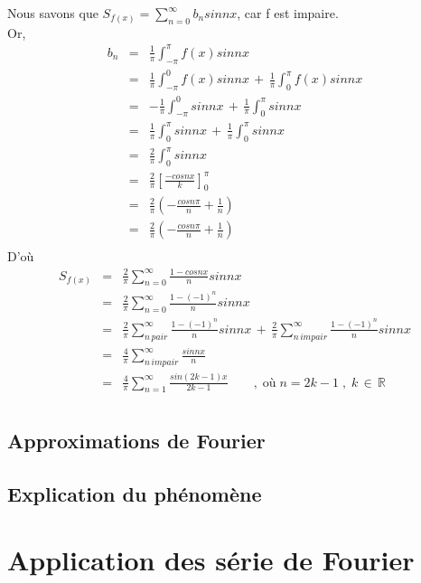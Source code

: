 \documentclass[a4paper,12pt]{report}
\begin{document}
Nous savons que $S_{f(x)}=\displaystyle\sum\limits_{n=0}^{\infty} b_{n}sinnx$, car f est impaire.\\
Or, \begin{eqnarray*}
b_{n}&=&\frac{1}{\pi}\int_{-\pi}^{\pi}f(x)sinnx\\
		 &=&\frac{1}{\pi}\int_{-\pi}^{0}f(x)sinnx\,+\,\frac{1}{\pi}\int_{0}^{\pi}f(x)sinnx\\
		 &=&-\frac{1}{\pi}\int_{-\pi}^{0}sinnx\,+\,\frac{1}{\pi}\int_{0}^{\pi}sinnx\\
		 &=&\frac{1}{\pi}\int_{0}^{\pi}sinnx\,+\,\frac{1}{\pi}\int_{0}^{\pi}sinnx\\
		 &=&\frac{2}{\pi}\int_{0}^{\pi}sinnx\\
		&=&\frac{2}{\pi}\left[\frac{-cosnx}{k}\right]_0^\pi\\
		 &=&\frac{2}{\pi}\left(-\frac{cosn\pi}{n}+\frac{1}{n}\right)\\
		 &=&\frac{2}{\pi}\left(-\frac{cosn\pi}{n}+\frac{1}{n}\right)\\
	\end{eqnarray*}
D'o\`u \begin{eqnarray*}
S_{f(x)}&=&\frac{2}{\pi}\displaystyle\sum\limits_{n=0}^{\infty}\frac{1-cosnx}{n}sinnx\\
		&=&\frac{2}{\pi}\displaystyle\sum\limits_{n=0}^{\infty}\frac{1-(-1)^{n}}{n}sinnx\\
		&=&\frac{2}{\pi}\sum\limits_{n\,pair}^{\infty}\frac{1-(-1)^{n}}{n}sinnx\,+\,\frac{2}{\pi}\sum\limits_{n\,impair}^{\infty}\frac{1-(-1)^{n}}{n}sinnx\\
		&=&\frac{4}{\pi}\sum\limits_{n\,impair}^{\infty}\frac{sinnx}{n}\\
		&=&\frac{4}{\pi}\sum\limits_{n=1}^{\infty}\frac{sin(2k-1)x}{2k-1}\qquad,\;\text{o\`u}\;n=2k-1\;,\;k\,\in\,\pmb{\mathbb{R}}\\
	\end{eqnarray*}
\section{Approximations de Fourier}

\section{Explication du ph\'enom\`ene}

\chapter{Application des série de Fourier}
\end{document}
